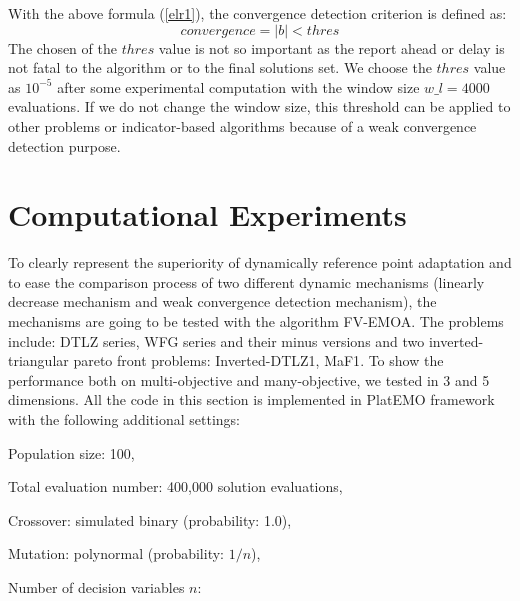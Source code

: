 \documentclass[conference]{IEEEtran}
\begin{document}
With the above formula (\ref{elr1}), the convergence detection criterion is defined as:
\begin{equation}\label{elr2}
  convergence = \lvert b \rvert < thres
\end{equation}
The chosen of the $thres$ value is not so important 
as the report ahead or delay is not fatal to the algorithm or to the final solutions set.
We choose the $thres$ value as $10^{-5}$ after some experimental computation with 
the window size $w\_ l = 4000$ evaluations. 
If we do not change the window size, 
this threshold can be applied to other problems or indicator-based algorithms
because of a weak convergence detection purpose.

% 
% 
%
\section{Computational Experiments}
To clearly represent the superiority of dynamically reference point adaptation 
and to ease the comparison process of two different dynamic mechanisms
(linearly decrease mechanism and weak convergence detection mechanism), 
the mechanisms are going to be tested with the algorithm FV-EMOA\cite{FVEMOA}.
The problems include: 
DTLZ series\cite{DTLZ}, WFG series\cite{WFG} and their minus versions\cite{minusTestProblem}
and two inverted-triangular pareto front problems: 
Inverted-DTLZ1\cite{hisao:RPexplanation}, MaF1\cite{MaF}.
To show the performance both on multi-objective and many-objective, we tested in 3 and 5 dimensions.
All the code in this section is implemented in PlatEMO framework\cite{PlatEMO} 
with the following additional settings:

Population size: 100, 

Total evaluation number: 400,000 solution evaluations,

Crossover: simulated binary (probability: 1.0),

Mutation: polynormal (probability: $1/n$),

Number of decision variables $n$:
\end{document}
